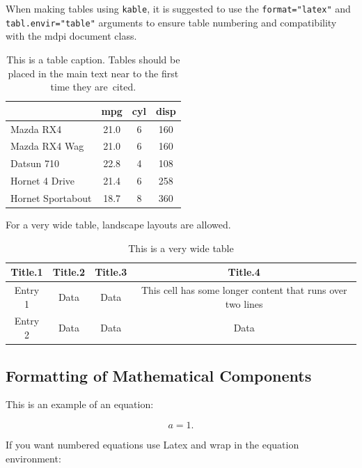 \documentclass[notspecified,article,submit,moreauthors,pdftex]{Definitions/mdpi}
\begin{document}
When making tables using \texttt{kable}, it is suggested to use the
\texttt{format="latex"} and \texttt{tabl.envir="table"} arguments to
ensure table numbering and compatibility with the mdpi document class.

\begin{table}[H]

\caption{\label{tab:tab1}This is a table caption. Tables should be placed in the 
             main text near to the first time they are~cited.}
\begin{tabular}[t]{lccc}
\toprule
  & mpg & cyl & disp\\
\midrule
Mazda RX4 & 21.0 & 6 & 160\\
Mazda RX4 Wag & 21.0 & 6 & 160\\
Datsun 710 & 22.8 & 4 & 108\\
Hornet 4 Drive & 21.4 & 6 & 258\\
Hornet Sportabout & 18.7 & 8 & 360\\
\bottomrule
\end{tabular}
\end{table}

For a very wide table, landscape layouts are allowed.

\startlandscape

\begin{table}[H]

\caption{\label{tab:tab2}This is a very wide table}
\begin{tabular}[t]{cccc}
\toprule
Title.1 & Title.2 & Title.3 & Title.4\\
\midrule
Entry 1 & Data & Data & This cell has some longer content that runs over
                               two lines\\
Entry 2 & Data & Data & Data\\
\bottomrule
\end{tabular}
\end{table}

\finishlandscape

\hypertarget{formatting-of-mathematical-components}{%
\subsection{Formatting of Mathematical
Components}\label{formatting-of-mathematical-components}}

This is an example of an equation:

\[
a = 1.
\]

If you want numbered equations use Latex and wrap in the equation
environment:
\end{document}
